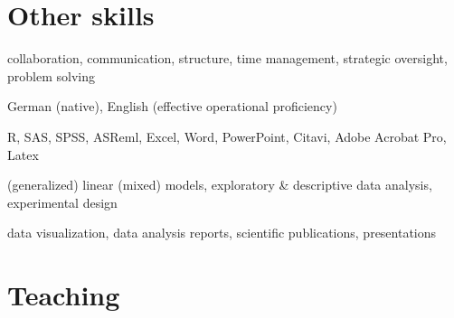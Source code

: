 \documentclass[11pt, a4paper]{awesome-cv}
\begin{document}
\hypertarget{other-skills}{%
\section{Other skills}\label{other-skills}}

\begin{cvskills}

  {collaboration, communication, structure, time management, strategic oversight, problem solving} 
  
  {German (native), English (effective operational proficiency)}
  
  {R, SAS, SPSS, ASReml, Excel, Word, PowerPoint, Citavi, Adobe Acrobat Pro, Latex} 
  
  {(generalized) linear (mixed) models, exploratory \& descriptive data analysis, experimental design} 
  
  {data visualization, data analysis reports, scientific publications, presentations} 
  

\end{cvskills}

\hypertarget{teaching}{%
\section{Teaching}\label{teaching}}
\end{document}
